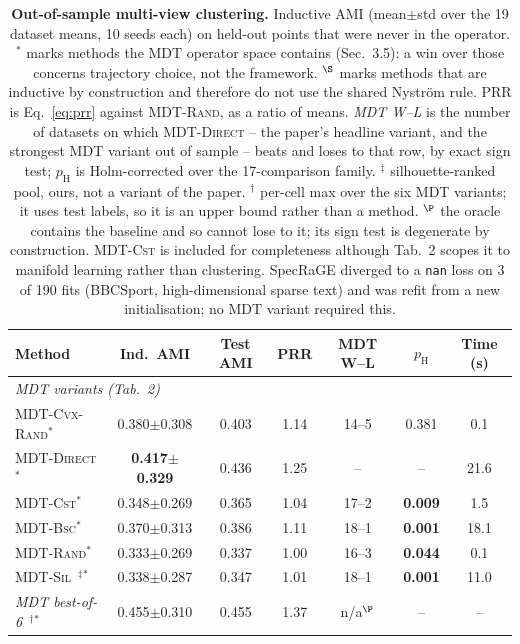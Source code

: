 \begin{table}[H]\centering\footnotesize
\caption{\textbf{Out-of-sample multi-view clustering.} Inductive AMI (mean$\pm$std over the 19 dataset means, 10 seeds each) on held-out points that were never in the operator. $^{*}$ marks methods the MDT operator space contains (Sec.~3.5): a win over those concerns trajectory choice, not the framework. $^{\S}$ marks methods that are inductive by construction and therefore do not use the shared Nystr\"om rule. PRR is Eq.~\ref{eq:prr} against MDT-\textsc{Rand}, as a ratio of means. \emph{MDT W--L} is the number of datasets on which MDT-\textsc{Direct} -- the paper's headline variant, and the strongest MDT variant out of sample -- beats and loses to that row, by exact sign test; $p_{\text{H}}$ is Holm-corrected over the 17-comparison family. $^\ddagger$ silhouette-ranked pool, ours, not a variant of the paper. $^\dagger$ per-cell max over the six MDT variants; it uses test labels, so it is an upper bound rather than a method. $^\P$ the oracle contains the baseline and so cannot lose to it; its sign test is degenerate by construction. MDT-\textsc{Cst} is included for completeness although Tab.~2 scopes it to manifold learning rather than clustering. SpecRaGE diverged to a \texttt{nan} loss on 3 of 190 fits (BBCSport, high-dimensional sparse text) and was refit from a new initialisation; no MDT variant required this.}
\label{tab:oos-multiview}
\begin{tabular}{l c c c c c c}
\toprule
Method & Ind.\ AMI & Test AMI & PRR & MDT W--L & $p_{\text{H}}$ & Time (s)\\
\midrule
\multicolumn{7}{l}{\emph{MDT variants (Tab.~2)}}\\
MDT-\textsc{Cvx-Rand}$^{*}$ & 0.380$\pm$0.308 & 0.403 & 1.14 & 14--5 & 0.381 & 0.1\\
MDT-\textsc{Direct}$^{*}$ & \textbf{0.417$\pm$0.329} & 0.436 & 1.25 & -- & -- & 21.6\\
MDT-\textsc{Cst}$^{*}$ & 0.348$\pm$0.269 & 0.365 & 1.04 & 17--2 & \textbf{0.009} & 1.5\\
MDT-\textsc{Bsc}$^{*}$ & 0.370$\pm$0.313 & 0.386 & 1.11 & 18--1 & \textbf{0.001} & 18.1\\
MDT-\textsc{Rand}$^{*}$ & 0.333$\pm$0.269 & 0.337 & 1.00 & 16--3 & \textbf{0.044} & 0.1\\
MDT-\textsc{Sil}~$^\ddagger$$^{*}$ & 0.338$\pm$0.287 & 0.347 & 1.01 & 18--1 & \textbf{0.001} & 11.0\\
\emph{MDT best-of-6}~$^\dagger$$^{*}$ & 0.455$\pm$0.310 & 0.455 & 1.37 & n/a$^{\P}$ & -- & --\\

\end{tabular}
\end{table}
